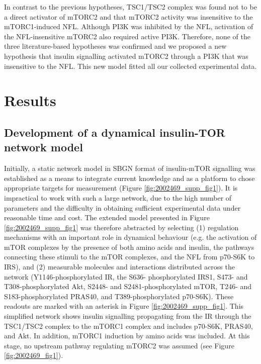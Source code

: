 In contrast to the previous hypotheses, TSC1/TSC2 complex was found not to be a direct activator of mTORC2 and that mTORC2 activity was insensitive to the mTORC1-induced NFL. Although PI3K was inhibited by the NFL, activation of the NFL-insensitive mTORC2 also required active PI3K. Therefore, none of the three literature-based hypotheses was confirmed and we proposed a new hypothesis that insulin signalling activated mTORC2 through a PI3K that was insensitive to the NFL. This new model fitted all our collected experimental data.

\section{Results}
\label{paper1-sec:Results}

\subsection{Development of a dynamical insulin-TOR network model}
\label{paper1-subsec:Development of a dynamical insulin-TOR network model}
Initially, a static network model in SBGN format \citep{lenovere2009systems} of insulin-mTOR signalling was established as a means to integrate current knowledge \citep{Zoncu2011, Howell2011, GarciaEcheverria2011, Polak2009, Cybulki2009, Feldman2010, Sengupta2010} and as a platform to chose appropriate targets for measurement (Figure \ref{fig:2002469_supp_fig1}). It is impractical to work with such a large network, due to the high number of parameters and the difficulty in obtaining sufficient experimental data under reasonable time and cost. The extended model presented in Figure \ref{fig:2002469_supp_fig1} was therefore abstracted by selecting (1) regulation mechanisms with an important role in dynamical behaviour (e.g. the activation of mTOR complexes by the presence of both amino acids and insulin, the pathways connecting these stimuli to the mTOR complexes, and the NFL from p70-S6K to IRS), and (2) measurable molecules and interactions distributed across the network (Y1146-phosphorylated IR, the S636-
phosphorylated IRS1, S473- and T308-phosphorylated Akt, S2448- and S2481-phosphorylated mTOR,  T246- and S183-phosphorylated PRAS40, and T389-phosphorylated p70-S6K). These readouts are marked with an asterisk in Figure \ref{fig:2002469_supp_fig1}. This simplified network shows insulin signalling propagating from the IR through the TSC1/TSC2 complex to the mTORC1 complex and includes p70-S6K, PRAS40, and Akt. In addition, mTORC1 induction by amino acids was included. At this stage, no upstream pathway regulating mTORC2 was assumed (see Figure \ref{fig:2002469_fig1}). \\
